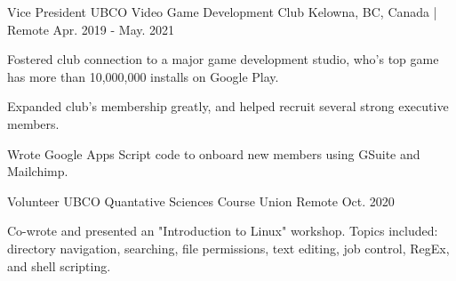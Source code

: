 

\begin{cventries}

  \cventry
    {Vice President} %
    {UBCO Video Game Development Club} %
    {Kelowna, BC, Canada | Remote} %
    {Apr. 2019 - May. 2021} %
    {
      \begin{cvitems} %
        \item 
        {
            Fostered club connection to a major game development studio, who's 
            top game has more than 10,000,000 installs on Google Play.
        }
        \item
        {
            Expanded club's membership greatly, and helped recruit several 
            strong executive members.
        }
        \item
        {
            Wrote Google Apps Script code to onboard new members using GSuite and Mailchimp.
        }
      \end{cvitems}
    }

  \cventry
    {Volunteer} %
    {UBCO Quantative Sciences Course Union} %
    {Remote} %
    {Oct. 2020} %
    {
      \begin{cvitems} %
        \item 
        {
            Co-wrote and presented an "Introduction to Linux" workshop. 
            Topics included: directory navigation, searching, file 
            permissions, text editing, job control, RegEx, and shell scripting.
        }
      \end{cvitems}
    }

\end{cventries}
